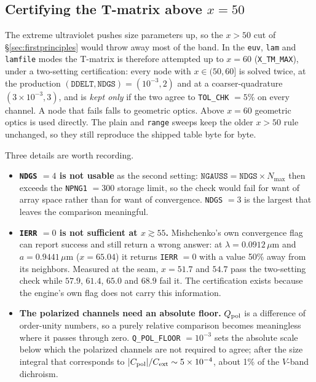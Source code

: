\documentclass{my_memo}
\newcommand{\code}[1]{\texttt{#1}}
\newcommand{\um}{\ensuremath{\,\mu\mathrm{m}}}
\begin{document}
\subsection{Certifying the T-matrix above $x = 50$}\label{sec:certify}

The extreme ultraviolet pushes size parameters up, so the $x > 50$ cut of
\S\ref{sec:firstprinciples} would throw away most of the band. In the \code{euv},
\code{lam} and \code{lamfile} modes the T-matrix is therefore attempted up to
$x = 60$ (\code{X\_TM\_MAX}), under a two-setting certification: every node with
$x\in(50,60]$ is solved twice, at the production
$(\code{DDELT},\code{NDGS}) = (10^{-3},2)$ and at a coarser-quadrature
$(3\times10^{-3},3)$, and is \emph{kept only} if the two agree to
\code{TOL\_CHK} $= 5\%$ on every channel. A node that fails falls to geometric
optics. Above $x = 60$ geometric optics is used directly. The plain and
\code{range} sweeps keep the older $x > 50$ rule unchanged, so they still
reproduce the shipped table byte for byte.

Three details are worth recording.

\begin{itemize}
\item \textbf{\code{NDGS} $= 4$ is not usable} as the second setting:
      $\code{NGAUSS} = \code{NDGS}\times N_{\max}$ then exceeds the
      \code{NPNG1} $= 300$ storage limit, so the check would fail for want of
      array space rather than for want of convergence. \code{NDGS} $=3$ is the
      largest that leaves the comparison meaningful.
\item \textbf{\code{IERR} $= 0$ is not sufficient at $x\gtrsim55$.} Mishchenko's
      own convergence flag can report success and still return a wrong answer:
      at $\lambda = 0.0912\um$ and $a = 0.9441\um$ ($x = 65.04$) it returns
      \code{IERR} $= 0$ with a value 50\% away from its neighbors. Measured at the
      seam, $x = 51.7$ and $54.7$ pass the two-setting check while $57.9$, $61.4$,
      $65.0$ and $68.9$ fail it. The certification exists because the engine's own
      flag does not carry this information.
\item \textbf{The polarized channels need an absolute floor.} $Q_{\rm pol}$ is a
      difference of order-unity numbers, so a purely relative comparison becomes
      meaningless where it passes through zero. \code{Q\_POL\_FLOOR} $= 10^{-3}$
      sets the absolute scale below which the polarized channels are not required
      to agree; after the size integral that corresponds to
      $|C_{\rm pol}|/C_{\rm ext}\sim5\times10^{-4}$, about 1\% of the $V$-band
      dichroism.
\end{itemize}
\end{document}
